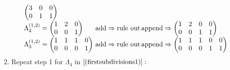 \[{\begin{array}{lll}
\begin{pmatrix}
3 & 0 & 0 \\
0 & 1 & 1
\end{pmatrix} \\
\Lambda^{(1,2)}_2 = \begin{pmatrix}
1 & 2 & 0\\
0 & 0 & 1
\end{pmatrix} & \!\!\!\!\hbox{add} \Rightarrow \hbox{rule out} &  \!\!\!\!\!\hbox{append} \Rightarrow \begin{pmatrix}
1 & 2 & 0 & 0\\
0 & 0 & 1 & 1
\end{pmatrix} \\
\Lambda^{(1,2)}_3 = \begin{pmatrix}
1 & 1 & 1 & 0\\
0 & 0 & 0 & 1
\end{pmatrix} & \!\!\!\!\hbox{add} \Rightarrow \hbox{rule out} & \!\!\!\!\! \hbox{append} \Rightarrow \begin{pmatrix}
1 & 1 & 1 & 0 & 0\\
0 & 0 & 0 & 1 & 1
\end{pmatrix}
\end{array}}\]
2. Repeat step 1 for \(\Lambda_4\) in \(\eqref{(firstsubdivisions1)}:\)\\
